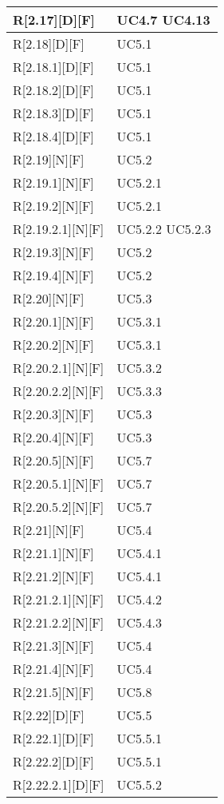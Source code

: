 \begin{longtable}{X | X}
\hline
R[2.17][D][F] & UC4.7 \newline UC4.13 \\
\hline
R[2.18][D][F] & UC5.1 \\
\hline
R[2.18.1][D][F] & UC5.1 \\
\hline
R[2.18.2][D][F] & UC5.1 \\
\hline
R[2.18.3][D][F] & UC5.1 \\
\hline
R[2.18.4][D][F] & UC5.1 \\
\hline
R[2.19][N][F] & UC5.2 \\
\hline
R[2.19.1][N][F] & UC5.2.1 \\
\hline
R[2.19.2][N][F] & UC5.2.1 \\
\hline
R[2.19.2.1][N][F] & UC5.2.2 \newline UC5.2.3 \\
\hline
R[2.19.3][N][F] & UC5.2 \\
\hline
R[2.19.4][N][F] & UC5.2 \\
\hline
R[2.20][N][F] & UC5.3 \\
\hline
R[2.20.1][N][F] & UC5.3.1 \\
\hline
R[2.20.2][N][F] & UC5.3.1 \\
\hline
R[2.20.2.1][N][F] & UC5.3.2 \\
\hline
R[2.20.2.2][N][F] & UC5.3.3 \\
\hline
R[2.20.3][N][F] & UC5.3 \\
\hline
R[2.20.4][N][F] & UC5.3 \\
\hline
R[2.20.5][N][F] & UC5.7 \\
\hline
R[2.20.5.1][N][F] & UC5.7 \\
\hline
R[2.20.5.2][N][F] & UC5.7 \\
\hline
R[2.21][N][F] & UC5.4 \\
\hline
R[2.21.1][N][F] & UC5.4.1 \\
\hline
R[2.21.2][N][F] & UC5.4.1 \\
\hline
R[2.21.2.1][N][F] & UC5.4.2 \\
\hline
R[2.21.2.2][N][F] & UC5.4.3 \\
\hline
R[2.21.3][N][F] & UC5.4 \\
\hline
R[2.21.4][N][F] & UC5.4 \\
\hline
R[2.21.5][N][F] & UC5.8 \\
\hline
R[2.22][D][F] & UC5.5 \\
\hline
R[2.22.1][D][F] & UC5.5.1 \\
\hline
R[2.22.2][D][F] & UC5.5.1 \\
\hline
R[2.22.2.1][D][F] & UC5.5.2 \\

\end{longtable}
